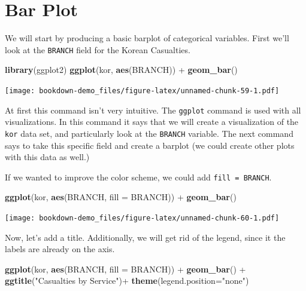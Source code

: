 \documentclass[]{book}
\newenvironment{Shaded}{\begin{snugshade}}{\end{snugshade}}
\newcommand{\KeywordTok}[1]{\textcolor[rgb]{0.13,0.29,0.53}{\textbf{{#1}}}}
\newcommand{\DataTypeTok}[1]{\textcolor[rgb]{0.13,0.29,0.53}{{#1}}}
\newcommand{\StringTok}[1]{\textcolor[rgb]{0.31,0.60,0.02}{{#1}}}
\newcommand{\NormalTok}[1]{{#1}}
\begin{document}
\section{Bar Plot}\label{bar-plot}

We will start by producing a basic barplot of categorical variables.
First we'll look at the \texttt{BRANCH} field for the Korean Casualties.

\begin{Shaded}
\begin{Highlighting}[]
\KeywordTok{library}\NormalTok{(ggplot2)}
\KeywordTok{ggplot}\NormalTok{(kor, }\KeywordTok{aes}\NormalTok{(BRANCH)) +}\StringTok{ }\KeywordTok{geom_bar}\NormalTok{()}
\end{Highlighting}
\end{Shaded}

\texttt{[image: bookdown-demo\_files/figure-latex/unnamed-chunk-59-1.pdf]}

At first this command isn't very intuitive. The \texttt{ggplot} command
is used with all visualizations. In this command it says that we will
create a visualization of the \texttt{kor} data set, and particularly
look at the \texttt{BRANCH} variable. The next command says to take this
specific field and create a barplot (we could create other plots with
this data as well.)

If we wanted to improve the color scheme, we could add
\texttt{fill\ =\ BRANCH}.

\begin{Shaded}
\begin{Highlighting}[]
\KeywordTok{ggplot}\NormalTok{(kor, }\KeywordTok{aes}\NormalTok{(BRANCH, }\DataTypeTok{fill =} \NormalTok{BRANCH)) +}\StringTok{ }\KeywordTok{geom_bar}\NormalTok{()}
\end{Highlighting}
\end{Shaded}

\texttt{[image: bookdown-demo\_files/figure-latex/unnamed-chunk-60-1.pdf]}

Now, let's add a title. Additionally, we will get rid of the legend,
since it the labels are already on the axis.

\begin{Shaded}
\begin{Highlighting}[]
\KeywordTok{ggplot}\NormalTok{(kor, }\KeywordTok{aes}\NormalTok{(BRANCH, }\DataTypeTok{fill =} \NormalTok{BRANCH)) +}\StringTok{ }\KeywordTok{geom_bar}\NormalTok{() +}\StringTok{ }
\StringTok{  }\KeywordTok{ggtitle}\NormalTok{(}\StringTok{"Casualties by Service"}\NormalTok{)+}\StringTok{ }\KeywordTok{theme}\NormalTok{(}\DataTypeTok{legend.position=}\StringTok{"none"}\NormalTok{)}
\end{Highlighting}
\end{Shaded}
\end{document}
